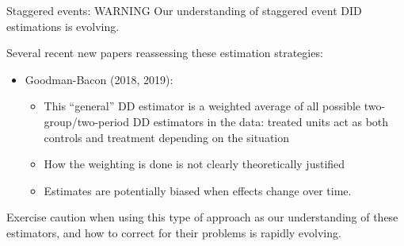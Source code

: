 \documentclass[
  ignorenonframetext,
]{beamer}
\providecommand{\tightlist}{%
  \setlength{\itemsep}{0pt}\setlength{\parskip}{0pt}}
\begin{document}
\begin{frame}{Staggered events: WARNING}
\protect\hypertarget{staggered-events-warning}{}
Our understanding of staggered event DID estimations is evolving.

Several recent new papers reassessing these estimation strategies:

\begin{itemize}
\tightlist
\item
  Goodman-Bacon (2018, 2019):

  \begin{itemize}
  \item
    This ``general'' DD estimator is a weighted average of all possible
    two-group/two-period DD estimators in the data: treated units act as
    both controls and treatment depending on the situation
  \item
    How the weighting is done is not clearly theoretically justified
  \item
    Estimates are potentially biased when effects change over time.
  \end{itemize}
\end{itemize}

Exercise caution when using this type of approach as our understanding
of these estimators, and how to correct for their problems is rapidly
evolving.
\end{frame}
\end{document}
